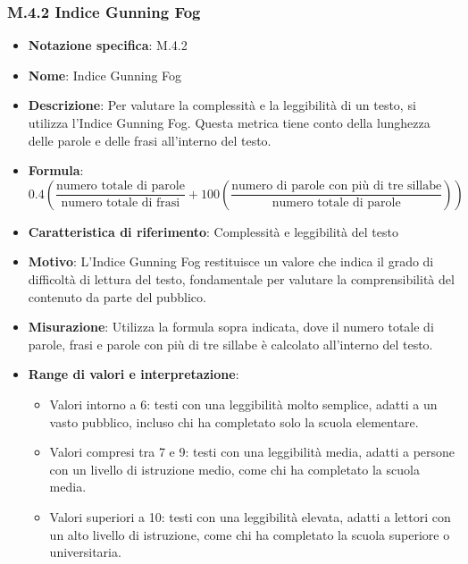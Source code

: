 \subsubsection{M.4.2 Indice Gunning Fog}
\begin{itemize}
    \item \textbf{Notazione specifica}: M.4.2
    \item \textbf{Nome}: Indice Gunning Fog
    \item \textbf{Descrizione}: Per valutare la complessità e la leggibilità di un testo, si utilizza l'Indice Gunning Fog. Questa metrica tiene conto della lunghezza delle parole e delle frasi all'interno del testo.
    \item \textbf{Formula}:
    \[ 0.4 \left( \frac{{\text{{numero totale di parole}}}}{{\text{{numero totale di frasi}}}} + 100 \left( \frac{{\text{{numero di parole con più di tre sillabe}}}}{{\text{{numero totale di parole}}}} \right) \right) \]
    \item \textbf{Caratteristica di riferimento}: Complessità e leggibilità del testo
    \item \textbf{Motivo}: L'Indice Gunning Fog restituisce un valore che indica il grado di difficoltà di lettura del testo, fondamentale per valutare la comprensibilità del contenuto da parte del pubblico.
    \item \textbf{Misurazione}: Utilizza la formula sopra indicata, dove il numero totale di parole, frasi e parole con più di tre sillabe è calcolato all'interno del testo.
    \item \textbf{Range di valori e interpretazione}: 
    \begin{itemize}
        \item Valori intorno a 6: testi con una leggibilità molto semplice, adatti a un vasto pubblico, incluso chi ha completato solo la scuola elementare.
        \item Valori compresi tra 7 e 9: testi con una leggibilità media, adatti a persone con un livello di istruzione medio, come chi ha completato la scuola media.
        \item Valori superiori a 10: testi con una leggibilità elevata, adatti a lettori con un alto livello di istruzione, come chi ha completato la scuola superiore o universitaria.
    \end{itemize}
\end{itemize}
